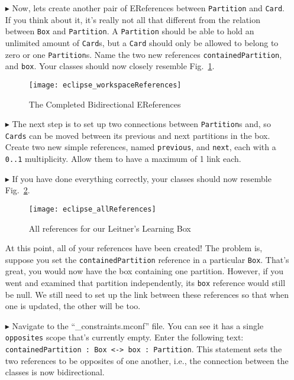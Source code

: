 \begin{itemize}
\item[$\blacktriangleright$] Now, lets create another pair of EReferences between \texttt{Partition} and \texttt{Card}. If you think about it, it's really not
all that different from the relation between \texttt{Box} and \texttt{Partition}. A \texttt{Partition} should be able to hold an unlimited amount of
\texttt{Card}s, but a \texttt{Card} should only be allowed to belong to zero or one \texttt{Partition}s. Name the two new references
\texttt{containedPartition}, and \texttt{box}. Your classes should now closely resemble Fig.~\ref{fig:almostAllReferences}.

\begin{figure}[htbp]
	\centering
  \texttt{[image: eclipse\_workspaceReferences]}
	\caption{The Completed Bidirectional EReferences}
	\label{fig:almostAllReferences}
\end{figure} 

\item[$\blacktriangleright$] The next step is to set up two connections between \texttt{Partition}s and, so \texttt{Cards} can be moved between its previous and
next partitions in the box. Create two new simple references, named \texttt{previous}, and \texttt{next}, each with a \texttt{0..1} multiplicity. Allow them to
have a maximum of 1 link each.

\item[$\blacktriangleright$] If you have done everything correctly, your classes should now resemble Fig.~\ref{fig:allReferences}. 

\begin{figure}[htbp]
	\centering
  \texttt{[image: eclipse\_allReferences]}
	\caption{All references for our Leitner's Learning Box}
	\label{fig:allReferences}
\end{figure} 

\newpage

At this point, all of your references have been created! The problem is, suppose you set the \texttt{containedPartition} reference in a particular \texttt{Box}.
That's great, you would now have the box containing one partition. However, if you went and examined that partition independently, its \texttt{box} reference
would still be null. We still need to set up the link between these references so that when one is updated, the other will be too.

\item[$\blacktriangleright$] Navigate to the ``\_constraints.mconf'' file. You can see it has a single \texttt{opposites} scope that's currently empty. Enter
the following text: \texttt{containedPartition : Box <-> box : Partition}. This statement sets the two references to be opposites of one another, i.e., the
connection between the classes is now bidirectional.


\end{itemize}
